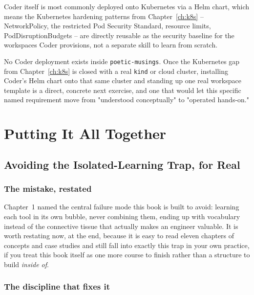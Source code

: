 \documentclass[11pt,twoside,openright]{book}
\begin{document}
Coder itself is most commonly deployed onto Kubernetes via a Helm chart, which means the
Kubernetes hardening patterns from Chapter~\ref{ch:k8s} -- NetworkPolicy, the restricted
Pod Security Standard, resource limits, PodDisruptionBudgets -- are directly reusable as
the security baseline for the workspaces Coder provisions, not a separate skill to learn
from scratch.

\begin{gap}
No Coder deployment exists inside \texttt{poetic-musings}. Once the Kubernetes gap from
Chapter~\ref{ch:k8s} is closed with a real \texttt{kind} or cloud cluster, installing
Coder's Helm chart onto that same cluster and standing up one real workspace template is a
direct, concrete next exercise, and one that would let this specific named requirement move
from "understood conceptually" to "operated hands-on."
\end{gap}

\part{Putting It All Together}

\chapter{Avoiding the Isolated-Learning Trap, for Real}

\section{The mistake, restated}

Chapter~1 named the central failure mode this book is built to avoid: learning each tool
in its own bubble, never combining them, ending up with vocabulary instead of the
connective tissue that actually makes an engineer valuable. It is worth restating now,
at the end, because it is easy to read eleven chapters of concepts and case studies and
still fall into exactly this trap in your own practice, if you treat this book itself as
one more course to finish rather than a structure to build \emph{inside of}.

\section{The discipline that fixes it}
\end{document}
